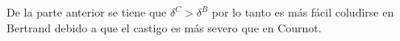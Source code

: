 \begin{enumerate}
    \begin{solution}
    De la parte anterior se tiene que $\delta^{C}>\delta^{B}$ por lo tanto es más fácil coludirse en Bertrand debido a que el castigo es más severo que en Cournot.
    \end{solution}
\end{enumerate}
